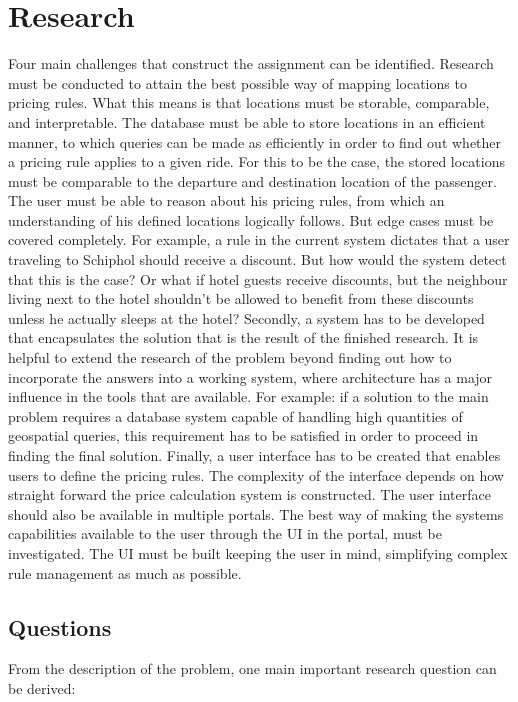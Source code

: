 \section{Research}
Four main challenges that construct the assignment can be identified. Research must be conducted to attain the best possible way of mapping locations to pricing rules. What this means is that locations must be storable, comparable, and interpretable. The database must be able to store locations in an efficient manner, to which queries can be made as efficiently in order to find out whether a pricing rule applies to a given ride. For this to be the case, the stored locations must be comparable to the departure and destination location of the passenger. The user must be able to reason about his pricing rules, from which an understanding of his defined locations logically follows. But edge cases must be covered completely. For example, a rule in the current system dictates that a user traveling to Schiphol should receive a discount. But how would the system detect that this is the case? Or what if hotel guests receive discounts, but the neighbour living next to the hotel shouldn't be allowed to benefit from these discounts unless he actually sleeps at the hotel? Secondly, a system has to be developed that encapsulates the solution that is the result of the finished research. It is helpful to extend the research of the problem beyond finding out how to incorporate the answers into a working system, where architecture has a major influence in the tools that are available. For example: if a solution to the main problem requires a database system capable of handling high quantities of geospatial queries, this requirement has to be satisfied in order to proceed in finding the final solution. Finally, a user interface has to be created that enables users to define the pricing rules. The complexity of the interface depends on how straight forward the price calculation system is constructed. The user interface should also be available in multiple portals. The best way of making the systems capabilities available to the user through the UI in the portal, must be investigated. The UI must be built keeping the user in mind, simplifying complex rule management as much as possible.

\subsection{Questions}

From the description of the problem, one main important research question can be derived:

